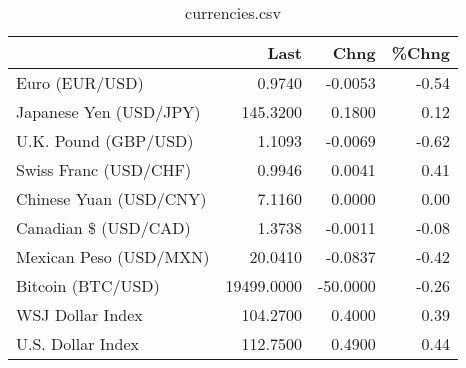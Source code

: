 \documentclass{article}%
\begin{document}
%


\begin{table}[htbp]%
\caption{currencies.csv}%
\centering%
\begin{adjustbox}{width=1\textwidth}%
\begin{tabular}{lrrr}
\toprule
                       &       Last &     Chng &  \%Chng \\
\midrule
        Euro (EUR/USD) &     0.9740 &  -0.0053 &  -0.54 \\
Japanese Yen (USD/JPY) &   145.3200 &   0.1800 &   0.12 \\
  U.K. Pound (GBP/USD) &     1.1093 &  -0.0069 &  -0.62 \\
 Swiss Franc (USD/CHF) &     0.9946 &   0.0041 &   0.41 \\
Chinese Yuan (USD/CNY) &     7.1160 &   0.0000 &   0.00 \\
  Canadian \$ (USD/CAD) &     1.3738 &  -0.0011 &  -0.08 \\
Mexican Peso (USD/MXN) &    20.0410 &  -0.0837 &  -0.42 \\
     Bitcoin (BTC/USD) & 19499.0000 & -50.0000 &  -0.26 \\
      WSJ Dollar Index &   104.2700 &   0.4000 &   0.39 \\
     U.S. Dollar Index &   112.7500 &   0.4900 &   0.44 \\
\bottomrule
\end{tabular}
%
\end{adjustbox}%
\end{table}

%
\end{document}
